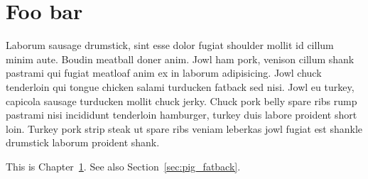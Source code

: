 \chapter{Foo bar}
\label{cha:foo_bar}

Laborum sausage drumstick, sint esse dolor fugiat shoulder mollit id cillum minim aute. Boudin meatball doner anim. Jowl ham pork, venison cillum shank pastrami qui fugiat meatloaf anim ex in laborum adipisicing. Jowl chuck tenderloin qui tongue chicken salami turducken fatback sed nisi. Jowl eu turkey, capicola sausage turducken mollit chuck jerky. Chuck pork belly spare ribs rump pastrami nisi incididunt tenderloin hamburger, turkey duis labore proident short loin. Turkey pork strip steak ut spare ribs veniam leberkas jowl fugiat est shankle drumstick laborum proident shank.

This is Chapter~\ref{cha:foo_bar}. See also Section~\ref{sec:pig_fatback}.
